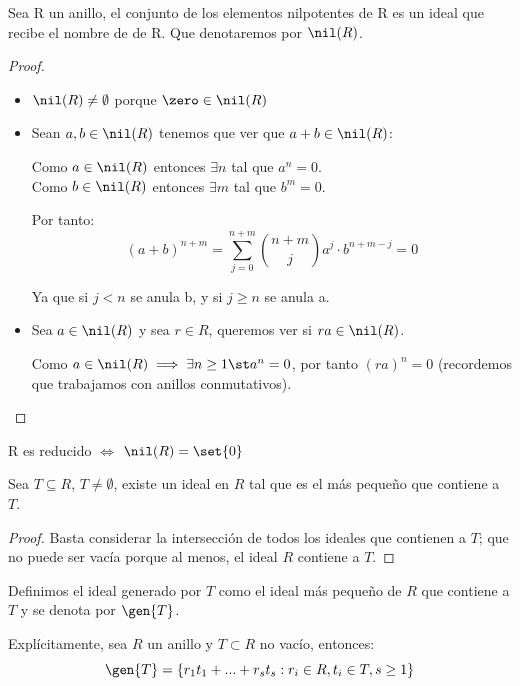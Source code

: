\begin{lemma}
 Sea R un anillo, el conjunto de los elementos nilpotentes de R es un ideal que recibe el nombre de  de R. Que denotaremos por $\nil(R)$.
\end{lemma}
\begin{proof}
	\begin{itemize}
		\item $\nil(R) \neq \emptyset$ porque $\zero \in \nil(R)$
		\item Sean $a,b \in \nil(R)$ tenemos que ver que $a+b \in \nil(R)$:

		Como $a \in \nil(R)$ entonces $\exists n$ tal que $a^n=0$.\\
		Como $b \in \nil(R)$ entonces $\exists m$ tal que $b^m=0$.

		Por tanto:
		$$(a+b)^{n+m} = \sum_{j=0}^{n+m} \binom{n+m}{j} a^j \cdot b^{n+m-j} = 0$$

		Ya que si $j<n$ se anula b, y si $j \geq n$ se anula a.
		\item Sea $a \in \nil(R)$ y sea $r\in R$, queremos ver si $ra \in \nil(R)$.

		Como $a\in \nil(R) \implies \exists n \geq 1 \st a^n=0$, por tanto $(ra)^n = 0$ (recordemos que trabajamos con anillos conmutativos).
	\end{itemize}
\end{proof}

\begin{prop}
	R es reducido $\Leftrightarrow$ $\nil(R)=\set{0}$
\end{prop}


\begin{prop}
	Sea $T \subseteq R$, $T \neq \emptyset$, existe un ideal en $R$ tal que es el más pequeño que contiene a $T$.
\end{prop}
\begin{proof}
	Basta considerar la intersección de todos los ideales que contienen a $T$; que no puede ser vacía porque al menos, el ideal $R$ contiene a $T$.
\end{proof}

\begin{defn}
Definimos el ideal generado por $T$ como el ideal más pequeño de $R$ que contiene a $T$ y se denota por $\gen{T}$.

Explícitamente, sea $R$ un anillo y $T \subset R$ no vacío, entonces:
$$ \gen{T} = \{r_1t_1+...+r_st_s: r_i \in R, t_i \in T, s \geq 1 \} $$
\end{defn}


